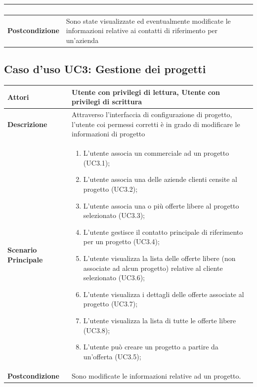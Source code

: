 \documentclass[12pt,a4paper,twoside,openright,english]{book}
\begin{document}
\begin{small}
\begin{longtable}{ | p{2.7cm} | p{12cm} |}
\begin{enumerate}
		\end{enumerate}
		\\ 
		\hline \textbf{Postcondizione} & Sono state visualizzate ed eventualmente modificate le informazioni relative ai contatti di riferimento per un’azienda\\ 
		\hline 
	\end{longtable}
	
	\hypertarget{UC3}{}
	\subsection{Caso d'uso UC3: Gestione dei progetti}
	\begin{longtable}{ | p{2.7cm} | p{12cm} |}
		\hline \textbf{Attori} & Utente con privilegi di lettura, Utente con privilegi di scrittura\\ 
		\hline \textbf{Descrizione} & Attraverso l’interfaccia di configurazione di progetto, l’utente coi permessi corretti è in grado di modificare le informazioni di progetto \\ 
		\hline \textbf{Scenario Principale} & \begin{enumerate}
			\item L’utente associa un commerciale ad un progetto  (UC3.1);
			\item L’utente associa una delle aziende clienti censite al progetto  (UC3.2);
			\item L’utente associa una o più offerte libere al progetto selezionato  (UC3.3);
			\item L’utente gestisce il contatto principale di riferimento per un progetto  (UC3.4);
			\item L’utente visualizza la lista delle offerte libere (non associate ad alcun progetto) relative al cliente selezionato  (UC3.6);
			\item L’utente visualizza i dettagli delle offerte associate al progetto  (UC3.7);
			\item L’utente visualizza la lista di tutte le offerte libere  (UC3.8);
			\item L’utente può creare un progetto a partire da un’offerta  (UC3.5);
			
		\end{enumerate}
		\\ 
		\hline \textbf{Postcondizione} & Sono modificate le informazioni relative ad un progetto. \\ 
		\hline 
	\end{longtable}
	
	\hypertarget{UC3.4}{}

\end{small}
\end{document}
